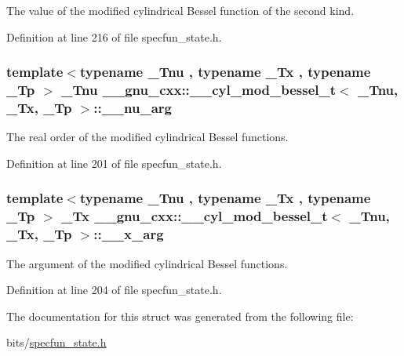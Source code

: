 The value of the modified cylindrical Bessel function of the second kind. 



Definition at line 216 of file specfun\+\_\+state.\+h.

\subsubsection[{\texorpdfstring{\+\_\+\+\_\+nu\+\_\+arg}{__nu_arg}}]{\setlength{\rightskip}{0pt plus 5cm}template$<$typename \+\_\+\+Tnu , typename \+\_\+\+Tx , typename \+\_\+\+Tp $>$ \+\_\+\+Tnu {\bf \+\_\+\+\_\+gnu\+\_\+cxx\+::\+\_\+\+\_\+cyl\+\_\+mod\+\_\+bessel\+\_\+t}$<$ \+\_\+\+Tnu, \+\_\+\+Tx, \+\_\+\+Tp $>$\+::\+\_\+\+\_\+nu\+\_\+arg}\hypertarget{struct____gnu__cxx_1_1____cyl__mod__bessel__t_a482597cb5cc7de3449debeb0a451a757}{}\label{struct____gnu__cxx_1_1____cyl__mod__bessel__t_a482597cb5cc7de3449debeb0a451a757}


The real order of the modified cylindrical Bessel functions. 



Definition at line 201 of file specfun\+\_\+state.\+h.

\subsubsection[{\texorpdfstring{\+\_\+\+\_\+x\+\_\+arg}{__x_arg}}]{\setlength{\rightskip}{0pt plus 5cm}template$<$typename \+\_\+\+Tnu , typename \+\_\+\+Tx , typename \+\_\+\+Tp $>$ \+\_\+\+Tx {\bf \+\_\+\+\_\+gnu\+\_\+cxx\+::\+\_\+\+\_\+cyl\+\_\+mod\+\_\+bessel\+\_\+t}$<$ \+\_\+\+Tnu, \+\_\+\+Tx, \+\_\+\+Tp $>$\+::\+\_\+\+\_\+x\+\_\+arg}\hypertarget{struct____gnu__cxx_1_1____cyl__mod__bessel__t_ad23dcffe64b074804b84abe4d0da7515}{}\label{struct____gnu__cxx_1_1____cyl__mod__bessel__t_ad23dcffe64b074804b84abe4d0da7515}


The argument of the modified cylindrical Bessel functions. 



Definition at line 204 of file specfun\+\_\+state.\+h.



The documentation for this struct was generated from the following file\+:\begin{DoxyCompactItemize}
\item 
bits/\hyperlink{specfun__state_8h}{specfun\+\_\+state.\+h}\end{DoxyCompactItemize}

